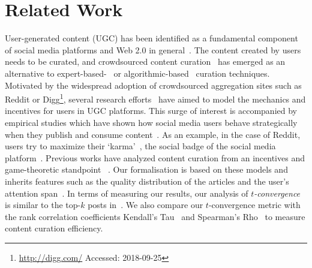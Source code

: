\section{Related Work}
  User-generated content (UGC) has been identified as a fundamental component of social media platforms and Web 2.0 in general~\cite{kaplan2010users}. The content created by users needs to be curated, and crowdsourced content curation~\cite{askalidis2013theoretical} has emerged as an alternative to expert-based-~\cite{stanoevska2012content} or algorithmic-based~\cite{rader2015understanding} curation techniques. Motivated by the widespread adoption of crowdsourced aggregation sites such as Reddit or Digg\footnote{\url{http://digg.com/} Accessed: 2018-09-25}, several research efforts~\cite{das2010ranking,ghosh2011incentivizing} have aimed to model the mechanics and incentives for users in UGC platforms. This surge of interest is accompanied  by empirical studies which have shown how
social media users behave strategically when they publish and consume content~\cite{may2014filter}. As an example, in the case of Reddit, users try to maximize their `karma'~\cite{bergstrom2011don}, the social badge of the social media platform~\cite{anderson2013steering}.
Previous works have analyzed content curation from an incentives and game-theoretic standpoint~\cite{ghosh2011incentivizing,das2010ranking,gupte2009news,may2014filter} . Our formalisation is based on  these models and inherits features such as the quality distribution of the articles and the user's attention span~\cite{askalidis2013theoretical,ghosh2011incentivizing}. In terms of measuring our results,  our analysis of \textit{$t$-convergence} is similar to the top-$k$ posts in~\cite{askalidis2013theoretical}. We also compare our $t$-convergence metric with the rank correlation coefficients Kendall's Tau~\cite{kendall1955rank} and Spearman's Rho~\cite{spearman1904proof} to measure content curation efficiency.

